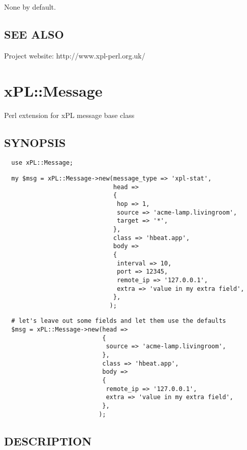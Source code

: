 None by default.

\subsection*{SEE ALSO\label{xPL::Listener_SEE_ALSO}}


Project website: http://www.xpl-perl.org.uk/

\section{xPL::Message\label{xPL::Message}}


Perl extension for xPL message base class

\subsection*{SYNOPSIS\label{xPL::Message_SYNOPSIS}}
\begin{verbatim}
  use xPL::Message;
\end{verbatim}
\begin{verbatim}
  my $msg = xPL::Message->new(message_type => 'xpl-stat',
                              head =>
                              {
                               hop => 1,
                               source => 'acme-lamp.livingroom',
                               target => '*',
                              },
                              class => 'hbeat.app',
                              body =>
                              {
                               interval => 10,
                               port => 12345,
                               remote_ip => '127.0.0.1',
                               extra => 'value in my extra field',
                              },
                             );
\end{verbatim}
\begin{verbatim}
  # let's leave out some fields and let them use the defaults
  $msg = xPL::Message->new(head =>
                           {
                            source => 'acme-lamp.livingroom',
                           },
                           class => 'hbeat.app',
                           body =>
                           {
                            remote_ip => '127.0.0.1',
                            extra => 'value in my extra field',
                           },
                          );
\end{verbatim}
\subsection*{DESCRIPTION\label{xPL::Message_DESCRIPTION}}


